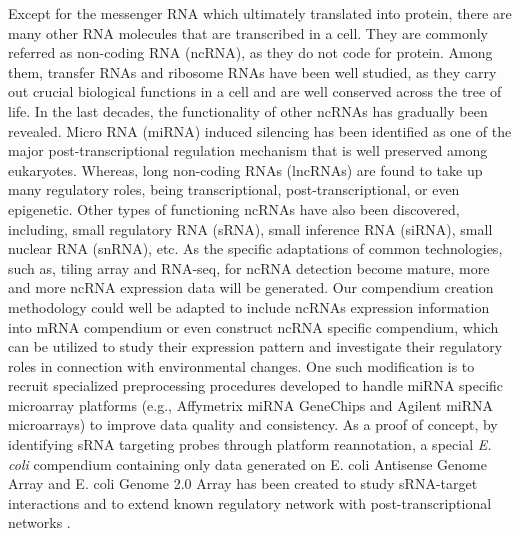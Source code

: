 Except for the messenger RNA which ultimately translated into protein, there are
many other RNA molecules that are transcribed in a cell.
%
They are commonly referred as non-coding RNA (ncRNA), as they do not code for
protein.
%
Among them, transfer RNAs and ribosome RNAs have been well studied, as they
carry out crucial biological functions in a cell and are well conserved across
the tree of life.
%
In the last decades, the functionality of other ncRNAs has gradually been
revealed.
%
Micro RNA (miRNA) induced silencing has been identified as one of the major
post-transcriptional regulation mechanism that is well preserved among
eukaryotes\cite{Chen2007a}.
%
Whereas, long non-coding RNAs (lncRNAs) are found to take up many regulatory
roles, being transcriptional, post-transcriptional, or even
epigenetic\cite{Baker2011}.
%
Other types of functioning ncRNAs have also been discovered, including, small
regulatory RNA (sRNA), small inference RNA (siRNA), small nuclear RNA (snRNA),
etc.
%
As the specific adaptations of common technologies, such as, tiling array and
RNA-seq, for ncRNA detection become mature, more and more ncRNA expression data
will be generated.
%
Our compendium creation methodology could well be adapted to include ncRNAs
expression information into mRNA compendium or even construct ncRNA specific
compendium, which can be utilized to study their expression pattern and
investigate their regulatory roles in connection with environmental changes.
%
One such modification is to recruit specialized preprocessing
procedures developed to handle miRNA specific microarray platforms
(e.g., Affymetrix miRNA GeneChips and Agilent miRNA microarrays) to
improve data quality and consistency.
%
As a proof of concept, by identifying sRNA targeting probes through platform 
reannotation, a special \textit{E. coli} compendium containing only data 
generated on E. coli Antisense Genome Array and E. coli Genome 2.0 Array has 
been created to study sRNA-target interactions and to extend known regulatory 
network with post-transcriptional networks \cite{Ishchukov2014}.






















